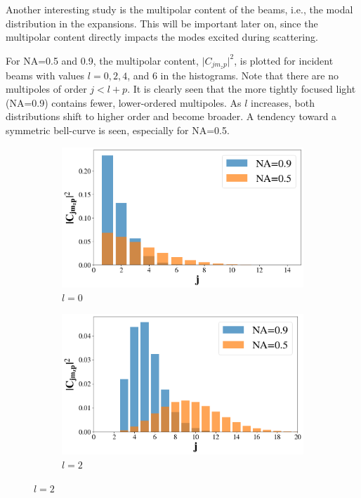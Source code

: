 Another interesting study is the multipolar content of the beams, i.e., the modal distribution in the expansions. This will be important later on, since the multipolar content directly impacts the modes excited during scattering.

For NA=0.5 and 0.9, the multipolar content, \( \lvert C_{jm_z p} \rvert^2 \), is plotted for incident beams with values \( l=0, 2, 4 \), and 6 in the histograms. Note that there are no multipoles of order \( j < l + p \). 
It is clearly seen that the more tightly focused light (NA=0.9) contains fewer, lower-ordered multipoles. As \( l \) increases, both distributions shift to higher order and become broader. A tendency toward a symmetric bell-curve is seen, especially for NA=0.5.

\begin{figure}
    \begin{subfigure}[b]{0.49\textwidth}
        \centering
        \includegraphics[width=\textwidth]{Figures/contentl0.png}
        \caption{\( l=0 \)}
        \label{fig:aa}
    \end{subfigure}
    \begin{subfigure}[b]{0.49\textwidth}
        \includegraphics[width=\textwidth]{Figures/contentl2.png}
        \caption{\( l=2 \)}
        \label{fig:bb}
    \end{subfigure}


\end{figure}
